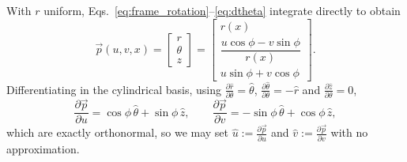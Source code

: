 \documentclass[11pt]{article}
\begin{document}
With $r$ uniform, Eqs.~\eqref{eq:frame_rotation}--\eqref{eq:dtheta} integrate
directly to obtain
\begin{equation}\label{eq:position}
    \boxed{\;\vec p(u,v,x) =
    \begin{bmatrix} r \\[2pt] \theta \\[2pt] z \end{bmatrix}
    = \begin{bmatrix} r(x) \\[4pt]
      \dfrac{u\cos\phi - v\sin\phi}{r(x)} \\[6pt]
      u\sin\phi + v\cos\phi \end{bmatrix}.\;}
\end{equation}
Differentiating in the cylindrical basis, using
$\frac{\partial \hat r}{\partial \theta} = \hat\theta$,
$\frac{\partial \hat\theta}{\partial \theta} = -\hat r$ and
$\frac{\partial \hat z}{\partial \theta} = 0$,
\begin{equation}\label{eq:pu_pv}
    \frac{\partial \vec p}{\partial u} = \cos\phi\,\hat\theta + \sin\phi\,\hat z,
    \qquad
    \frac{\partial \vec p}{\partial v} = -\sin\phi\,\hat\theta + \cos\phi\,\hat z,
\end{equation}
which are exactly orthonormal, so we may set
$\hat u := \frac{\partial \vec p}{\partial u}$ and
$\hat v := \frac{\partial \vec p}{\partial v}$ with no approximation.
\end{document}
